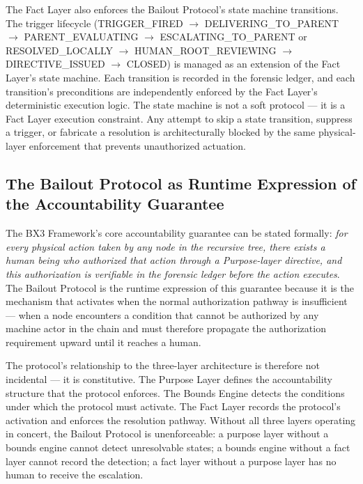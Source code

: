 The Fact Layer also enforces the Bailout Protocol's state machine transitions. The trigger lifecycle (TRIGGER\_FIRED $\rightarrow$ DELIVERING\_TO\_PARENT $\rightarrow$ PARENT\_EVALUATING $\rightarrow$ ESCALATING\_TO\_PARENT or RESOLVED\_LOCALLY $\rightarrow$ HUMAN\_ROOT\_REVIEWING $\rightarrow$ DIRECTIVE\_ISSUED $\rightarrow$ CLOSED) is managed as an extension of the Fact Layer's state machine. Each transition is recorded in the forensic ledger, and each transition's preconditions are independently enforced by the Fact Layer's deterministic execution logic. The state machine is not a soft protocol — it is a Fact Layer execution constraint. Any attempt to skip a state transition, suppress a trigger, or fabricate a resolution is architecturally blocked by the same physical-layer enforcement that prevents unauthorized actuation.

\subsection{The Bailout Protocol as Runtime Expression of the Accountability Guarantee}

The BX3 Framework's core accountability guarantee can be stated formally: \emph{for every physical action taken by any node in the recursive tree, there exists a human being who authorized that action through a Purpose-layer directive, and this authorization is verifiable in the forensic ledger before the action executes}. The Bailout Protocol is the runtime expression of this guarantee because it is the mechanism that activates when the normal authorization pathway is insufficient — when a node encounters a condition that cannot be authorized by any machine actor in the chain and must therefore propagate the authorization requirement upward until it reaches a human.

The protocol's relationship to the three-layer architecture is therefore not incidental — it is constitutive. The Purpose Layer defines the accountability structure that the protocol enforces. The Bounds Engine detects the conditions under which the protocol must activate. The Fact Layer records the protocol's activation and enforces the resolution pathway. Without all three layers operating in concert, the Bailout Protocol is unenforceable: a purpose layer without a bounds engine cannot detect unresolvable states; a bounds engine without a fact layer cannot record the detection; a fact layer without a purpose layer has no human to receive the escalation.

